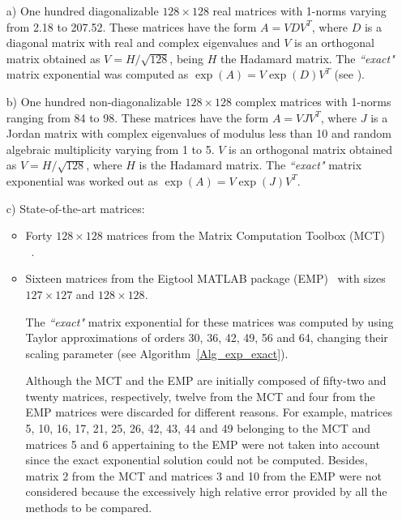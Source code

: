 \documentclass[preprint,10pt,numbers,sort&compress]{elsarticle}
\begin{document}
\begin{itemize}
        \item[a)]  One hundred diagonalizable  $128 \times 128$ real matrices with 1-norms varying from 2.18 to 207.52. These matrices have the form  $A=VDV^T$, where $D$ is a diagonal matrix with real and complex eigenvalues and $V$ is an
        orthogonal matrix obtained as $V=H/\sqrt{128}$, being $H$ the Hadamard matrix.
        The {\it``exact"} matrix exponential was computed as $\exp(A)=V\exp(D)V^T$ (see \cite[pp. 10]{High08}).         

        \item[b)] One hundred non-diagonalizable $128 \times 128$ complex matrices with 1-norms ranging from 84 to 98. These matrices have the form $A=VJV^T$, where $J$ is a Jordan matrix with complex eigenvalues of modulus less than 10 and random algebraic multiplicity varying from 1 to 5. $V$ is an orthogonal matrix obtained as $V=H/\sqrt{128}$, where $H$ is the Hadamard matrix.
        The {\it``exact"} matrix exponential was worked out as $\exp(A)=V\exp(J)V^T$.         
        \item[c)] State-of-the-art matrices:\begin{itemize}
        \item Forty $128 \times 128$ matrices from the Matrix Computation Toolbox (MCT) ~\cite{higham1995test}.
        \item Sixteen matrices from the Eigtool MATLAB package (EMP)~\cite{wrighteigtool} with sizes $127 \times 127$ and $128 \times 128$.
        
                         The {\it``exact"} matrix exponential for these matrices was computed by using Taylor approximations of orders 30, 36, 42, 49, 56 and 64, changing their scaling parameter (see Algorithm~\ref{Alg_exp_exact}).         
        
                 Although the MCT and the EMP are initially composed of fifty-two and twenty matrices, respectively, twelve from the MCT and four from the EMP matrices were discarded for different reasons. For example, matrices 5, 10, 16, 17, 21, 25, 26, 42, 43, 44 and 49 belonging to the MCT and matrices 5 and 6 appertaining to the EMP were not taken into account since the exact exponential solution could not be computed. Besides, matrix 2 from the MCT and matrices 3 and 10 from the EMP were not considered because the excessively high relative error provided by all the methods to be compared.   
\end{itemize}         
       
\end{itemize}
\end{document}
